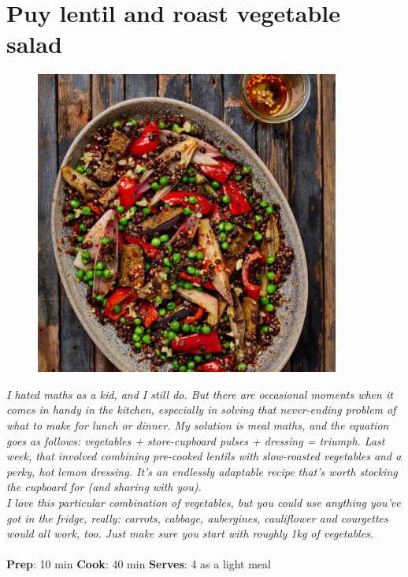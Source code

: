 \documentclass{book}
\begin{document}
\section{Puy lentil and roast vegetable salad}
\begin{figure}
\centering\includegraphics[width=10cm,height=10cm,keepaspectratio]{Recipe_Pictures/Puy_lentil_and_roast_vegetable_salad.png}
\end{figure}
\emph{I hated maths as a kid, and I still do. But there are occasional moments when it comes in handy in the kitchen, especially in solving that never-ending problem of what to make for lunch or dinner. My solution is meal maths, and the equation goes as follows: vegetables + store-cupboard pulses + dressing = triumph. Last week, that involved combining pre-cooked lentils with slow-roasted vegetables and a perky, hot lemon dressing. It’s an endlessly adaptable recipe that’s worth stocking the cupboard for (and sharing with you).\\ 
I love this particular combination of vegetables, but you could use anything you’ve got in the fridge, really: carrots, cabbage, aubergines, cauliflower and courgettes would all work, too. Just make sure you start with roughly 1kg of vegetables.}\\\\ 
\textbf{Prep}: 10 min
\textbf{Cook}: 40 min
\textbf{Serves}: 4 as a light meal
\end{document}
